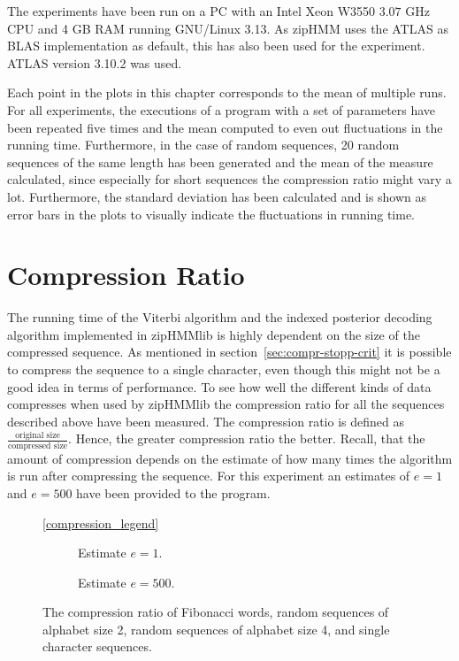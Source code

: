 The experiments have been run on a PC with an Intel Xeon W3550 $3.07$ GHz CPU
and 4 GB RAM running GNU/Linux 3.13. As zipHMM uses the ATLAS as BLAS
implementation as default, this has also been used for the experiment. ATLAS
version 3.10.2 was used.

Each point in the plots in this chapter corresponds to the mean of multiple
runs. For all experiments, the executions of a program with a set of parameters
have been repeated five times and the mean computed to even out fluctuations in
the running time. Furthermore, in the case of random sequences, 20 random
sequences of the same length has been generated and the mean of the measure
calculated, since especially for short sequences the compression ratio might vary
a lot. Furthermore, the standard deviation has been calculated and is shown as
error bars in the plots to visually indicate the fluctuations in running time.

\section{Compression Ratio}
\label{sec:compression-ratio}

The running time of the Viterbi algorithm and the indexed posterior decoding
algorithm implemented in zipHMMlib is highly dependent on the size of the
compressed sequence. As mentioned in section~\ref{sec:compr-stopp-crit} it is
possible to compress the sequence to a single character, even though this might
not be a good idea in terms of performance. To see how well the different kinds
of data compresses when used by zipHMMlib the compression ratio for all the
sequences described above have been measured. The compression ratio is defined
as $\frac{\text{original size}}{\text{compressed size}}$. Hence, the greater
compression ratio the better. Recall, that the amount of compression depends on
the estimate of how many times the algorithm is run after compressing the
sequence. For this experiment an estimates of $e = 1$ and $e = 500$ have been
provided to the program.

\begin{figure}
  \centering\ref{compression_legend}
  \begin{subfigure}[b]{0.5\textwidth}
    \centering 
    \caption{Estimate $e = 1$.}
  \end{subfigure}%
  \begin{subfigure}[b]{0.5\textwidth}
    \centering 
    \caption{Estimate $e = 500$.}
  \end{subfigure}
  \caption{The compression ratio of Fibonacci words, random sequences of
    alphabet size 2, random sequences of alphabet size 4, and single character
    sequences.}
  \label{fig:compression_ratio}
\end{figure}

